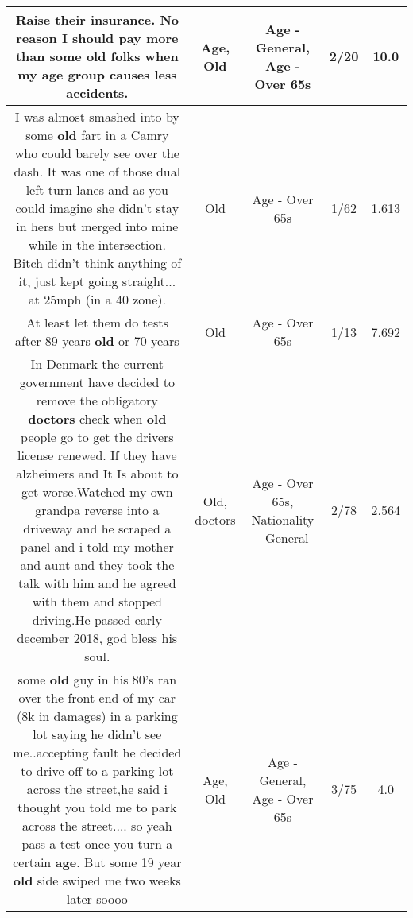 \documentclass[11pt]{article}
\newlength\mylength
\begin{document}
\begin{center}
\begin{longtable}{|C{.65\mylength}|C{.30\mylength}|C{.12\mylength}|C{.12\mylength}|C{.12\mylength}|}
  \small Raise their insurance. No reason I should pay more than some \textbf{old} folks when my \textbf{age} group causes less accidents.\normalsize   & Age, Old & Age - General, Age - Over 65s & 2/20 & 10.0 \\  \hline
  \small I was almost smashed into by some \textbf{old} fart in a Camry who could barely see over the dash. It was one of those dual left turn lanes and as you could imagine she didn't stay in hers but merged into mine while in the intersection. Bitch didn't think anything of it, just kept going straight... at 25mph (in a 40 zone).\normalsize   & Old & Age - Over 65s & 1/62 & 1.613 \\  \hline
  \small At least let them do tests after 89 years \textbf{old} or 70 years\normalsize   & Old & Age - Over 65s & 1/13 & 7.692 \\  \hline
  \small In Denmark the current government have decided to remove the obligatory \textbf{doctors} check when \textbf{old} people go to get the drivers license renewed. If they have alzheimers and It Is about to get worse.Watched my own grandpa reverse into a driveway and he scraped a panel and i told my mother and aunt and they took the talk with him and he agreed with them and stopped driving.He passed early december 2018, god bless his soul.\normalsize   & Old, doctors & Age - Over 65s, Nationality - General & 2/78 & 2.564 \\  \hline
  \small some \textbf{old} guy in his 80's ran over the front end of my car (8k in damages) in a parking lot saying he didn't see me..accepting fault he decided to drive off to a parking lot across the street,he said i thought you told me to park across the street.... so yeah pass a test once you turn a certain \textbf{age}. But some 19 year \textbf{old} side swiped me two weeks later soooo\normalsize   & Age, Old & Age - General, Age - Over 65s & 3/75 & 4.0 \\  \hline

\end{longtable}
\end{center}
\end{document}
